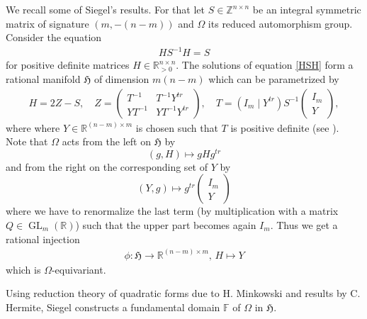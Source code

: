 \documentclass[10pt, preprint]{elsarticle}
\theoremstyle{definition}
\theoremstyle{definition}
\newcommand{\Z}{\mathbb{Z}}
\newcommand{\R}{\mathbb{R}}
\newcommand{\GL}{\operatorname{GL}}
\newcommand{\FF}{\mathbb{F}}
\newcommand{\Rsgt}{\mathbb{R}^{n\times n}_{>0}}
\newcommand{\FH}{\mathfrak{H}}
\begin{document}
We recall some of Siegel's results. For that let $S\in\Z^{n\times n}$ be an integral symmetric matrix of signature $(m, -(n-m))$ and $\Omega$ its reduced automorphism group. Consider the equation
\begin{align}\label{HSH}
HS^{-1}H=S
\end{align}
for positive definite matrices $H\in\Rsgt$. The solutions of equation \eqref{HSH} form a rational manifold $\mathfrak{H}$ of dimension $m(n-m)$ which can be parametrized by
\begin{align}\label{Hmanifold}
H=2Z-S,\quad Z=\left(\begin{array}{c|c} T^{-1} & T^{-1}Y^{tr} \\  \hline YT^{-1} & YT^{-1}Y^{tr} \end{array}\right),\quad T=(I_m\mid Y^{tr})S^{-1}\left(\begin{array}{c} I_m \\ \hline Y\end{array}\right),
\end{align}
where where $Y\in\R^{(n-m)\times m}$ is chosen such that $T$ is positive definite (see \cite[Equation (35)]{Siegel}). Note that $\Omega$ acts from the left on $\mathfrak{H}$ by 
\[(g,H)\mapsto gHg^{tr}\]
and from the right on the corresponding set of $Y$ by
\[(Y,g)\mapsto g^{tr}\left(\begin{array}{c} I_m \\ \hline Y\end{array}\right)\]
where we have to renormalize the last term (by multiplication with a matrix $Q\in\GL_m(\R)$) such that the upper part becomes again $I_m$. Thus we get a rational injection
\begin{align}\label{eqphi}
\phi:\mathfrak{H}\rightarrow \R^{(n-m)\times m},\, H\mapsto Y
\end{align}
which is $\Omega$-equivariant. 

Using reduction theory of quadratic forms due to H. Minkowski and results by C. Hermite, Siegel constructs a fundamental domain $\FF$ of $\Omega$ in $\FH$.
\end{document}
